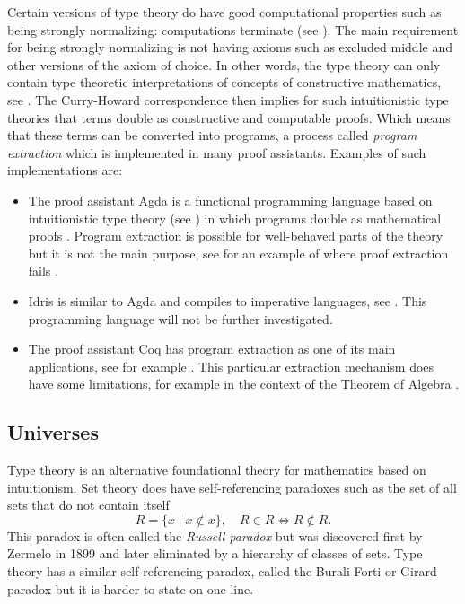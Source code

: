 \documentclass[12pt,a4paper,twoside,xetex]{book} %
\newcommand{\keyword}[1]{\emph{#1}\index{#1}}
\begin{document}
Certain versions of type theory do have good computational properties such as 
being strongly normalizing: computations terminate (see ). 
The main requirement for being strongly normalizing is not having axioms such 
as excluded middle and other versions of the axiom of choice. In other words, 
the type theory can only contain type theoretic interpretations of concepts of 
constructive mathematics, see . The Curry-Howard 
correspondence then implies for such intuitionistic type theories that terms 
double as constructive and computable proofs. Which means that these terms can 
be converted into programs, a process called \keyword{program extraction} which is 
implemented in many proof assistants. Examples of such implementations are:
\begin{itemize}
\item The proof assistant Agda is a functional programming language based on 
intuitionistic type theory (see ) in which programs double as 
mathematical proofs \cite{Abel2019}. Program extraction is possible for 
well-behaved parts of the theory but it is not the main purpose, see for an example of where proof extraction fails .
\item Idris is similar to Agda and compiles to imperative 
languages, see \cite{Brady2018}. This programming language will not be further investigated.

\item   The proof assistant Coq \cite{Arias2019} has program extraction as one 
of its main applications, see for example \cite{Pit-Claudel2018}. This 
particular extraction mechanism does have some limitations, for example in the 
context of the Theorem of Algebra \cite{Cruz-Filipe2005}.
\end{itemize}


\subsection{Universes}\label{universes}

Type theory is an alternative foundational theory for mathematics based on intuitionism. Set theory does have self-referencing paradoxes such as the set of all sets that do not contain itself \[ R = \{x \mid x \not \in x \}, \quad R\in R \Leftrightarrow R \not \in R. \] This paradox is often called the \keyword{Russell paradox} but was discovered first by Zermelo in 1899 and later eliminated by a hierarchy of classes of sets. Type theory has a similar self-referencing paradox, called the Burali-Forti or Girard paradox but it is harder to state on one line.
\end{document}
